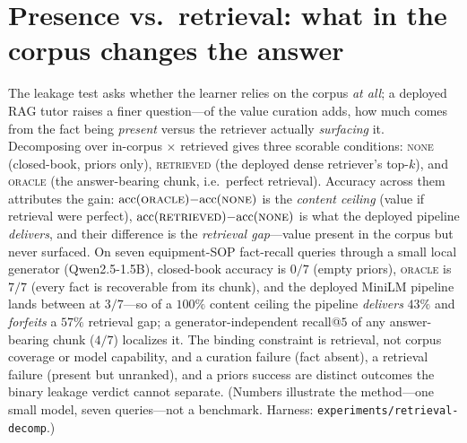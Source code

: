 \documentclass{article}
\begin{document}
\section{Presence vs.\ retrieval: what in the corpus changes the answer}
\label{app:retrieval}
The leakage test asks whether the learner relies on the corpus \emph{at all}; a deployed RAG tutor
raises a finer question---of the value curation adds, how much comes from the fact being \emph{present}
versus the retriever actually \emph{surfacing} it. Decomposing over in-corpus $\times$ retrieved gives
three scorable conditions: \textsc{none} (closed-book, priors only), \textsc{retrieved} (the deployed
dense retriever's top-$k$), and \textsc{oracle} (the answer-bearing chunk, i.e.\ perfect retrieval).
Accuracy across them attributes the gain: $\mathrm{acc}(\textsc{oracle}){-}\mathrm{acc}(\textsc{none})$
is the \emph{content ceiling} (value if retrieval were perfect),
$\mathrm{acc}(\textsc{retrieved}){-}\mathrm{acc}(\textsc{none})$ is what the deployed pipeline
\emph{delivers}, and their difference is the \emph{retrieval gap}---value present in the corpus but never
surfaced. On seven equipment-SOP fact-recall queries through a small local generator (Qwen2.5-1.5B),
closed-book accuracy is $0/7$ (empty priors), \textsc{oracle} is $7/7$ (every fact is recoverable from
its chunk), and the deployed MiniLM pipeline lands between at $3/7$---so of a $100\%$ content ceiling the
pipeline \emph{delivers} $43\%$ and \emph{forfeits} a $57\%$ retrieval gap; a generator-independent
recall@$5$ of any answer-bearing chunk ($4/7$) localizes it. The binding constraint is retrieval, not
corpus coverage or model capability, and a curation failure (fact absent), a retrieval failure (present
but unranked), and a priors success are distinct outcomes the binary leakage verdict cannot separate.
(Numbers illustrate the method---one small model, seven queries---not a benchmark. Harness:
\texttt{experiments/retrieval-decomp}.)
\end{document}
